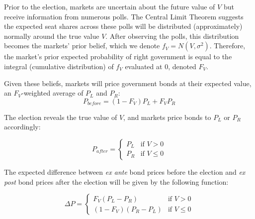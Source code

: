 \documentclass[12pt]{article}
\begin{document}
Prior to the election, markets are uncertain about the future value of $V$ but receive information from numerous polls. The Central Limit Theorem suggests the expected seat shares across these polls will be distributed (approximately) normally around the true value $V$. After observing the polls, this distribution becomes the markets' prior belief, which we denote $f_V = N(V,\sigma^2)$. Therefore, the market's prior expected probability of right government is equal to the integral (cumulative distribution) of $f_V$ evaluated at $0$, denoted $F_V$.


Given these beliefs, markets will price government bonds at their expected value, an $F_V$-weighted average of $P_L$ and $P_R$:
\begin{equation*}
P_{before} = (1-F_V)P_L + F_V P_R
\end{equation*}

\noindent The election reveals the true value of $V$, and markets price bonds to $P_L$ or $P_R$ accordingly:

\[
  P_{after} =
  \begin{cases}
                                   P_L & \text{if $V > 0$} \\
                                   P_R & \text{if $V \leq 0$} 
  \end{cases}
\]

\noindent The expected difference between \textit{ex ante} bond prices before the election and \textit{ex post} bond prices after the election will be given by the following function:

\begin{equation}
  \Delta P =
  \begin{cases}
                                   F_V(P_L-P_R) & \text{if $V > 0$} \\
                                   (1-F_V)(P_R-P_L)& \text{if $V \leq 0$}
  \end{cases}
\end{equation}
\end{document}
